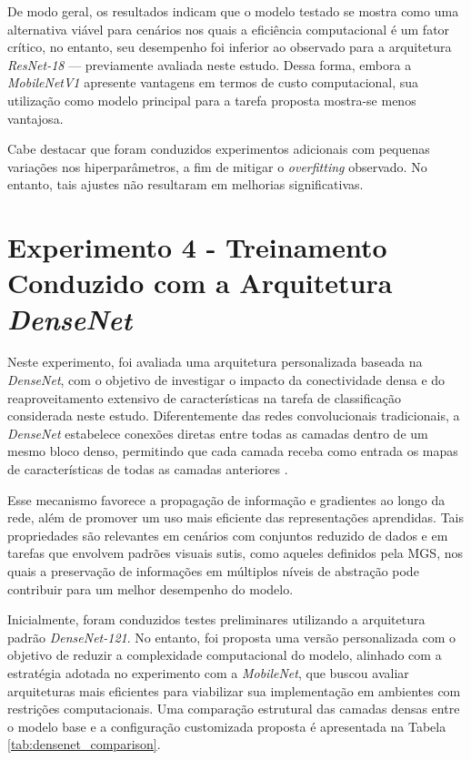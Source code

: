 De modo geral, os resultados indicam que o modelo testado se mostra como uma alternativa viável para cenários nos quais a eficiência computacional é um fator crítico, no entanto, seu desempenho foi inferior ao observado para a arquitetura \textit{ResNet-18} — previamente avaliada neste estudo. Dessa forma, embora a \textit{MobileNetV1} apresente vantagens em termos de custo computacional, sua utilização como modelo principal para a tarefa proposta mostra-se menos vantajosa.

Cabe destacar que foram conduzidos experimentos adicionais com pequenas variações nos hiperparâmetros, a fim de mitigar o \textit{overfitting} observado. No entanto, tais ajustes não resultaram em melhorias significativas. 

\section{Experimento 4 - Treinamento Conduzido com a Arquitetura \textit{DenseNet}}

Neste experimento, foi avaliada uma arquitetura personalizada baseada na \textit{DenseNet}, com o objetivo de investigar o impacto da conectividade densa e do reaproveitamento extensivo de características na tarefa de classificação considerada neste estudo. Diferentemente das redes convolucionais tradicionais, a \textit{DenseNet} estabelece conexões diretas entre todas as camadas dentro de um mesmo bloco denso, permitindo que cada camada receba como entrada os mapas de características de todas as camadas anteriores \cite{Huang2017}.

Esse mecanismo favorece a propagação de informação e gradientes ao longo da rede, além de promover um uso mais eficiente das representações aprendidas. Tais propriedades são relevantes em cenários com conjuntos reduzido de dados e em tarefas que envolvem padrões visuais sutis, como aqueles definidos pela \acs{MGS}, nos quais a preservação de informações em múltiplos níveis de abstração pode contribuir para um melhor desempenho do modelo.

Inicialmente, foram conduzidos testes preliminares utilizando a arquitetura padrão \textit{DenseNet-121}. No entanto, foi proposta uma versão personalizada com o objetivo de reduzir a complexidade computacional do modelo, alinhado com a estratégia adotada no experimento com a \textit{MobileNet}, que buscou avaliar arquiteturas mais eficientes para viabilizar sua implementação em ambientes com restrições computacionais. Uma comparação estrutural das camadas densas entre o modelo base e a configuração customizada proposta é apresentada na Tabela \ref{tab:densenet_comparison}.

